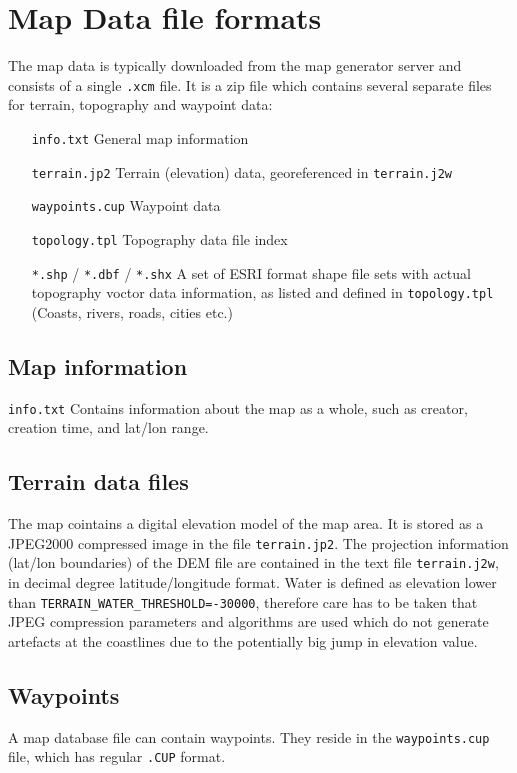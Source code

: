 \section{Map Data file formats}
The map data is typically downloaded from the map generator server and consists of a single \texttt{.xcm} file.
It is a zip file which contains several separate files for terrain, topography and waypoint data:
\begin{itemize}
\item[\texttt{info.txt}] General map information
\item[\texttt{terrain.jp2}] Terrain (elevation) data, georeferenced in \texttt{terrain.j2w}
\item[\texttt{waypoints.cup}] Waypoint data
\item[\texttt{topology.tpl}] Topography data file index
\item[\texttt{*.shp} / \texttt{*.dbf} / \texttt{*.shx}] A set of ESRI format shape file sets with actual topography voctor data information, as listed and defined in \texttt{topology.tpl} (Coasts, rivers, roads, cities etc.)
\end{itemize}
\subsection{Map information}
\texttt{info.txt}
Contains information about the map as a whole, such as creator, creation time, and lat/lon range.

\subsection{Terrain data files}
The map cointains a digital elevation model of the map area. It is stored as a JPEG2000 compressed image in the file \texttt{terrain.jp2}. The projection information (lat/lon boundaries) of the DEM file are contained in the text file \texttt{terrain.j2w}, in decimal degree latitude/longitude format.
Water is defined as elevation lower than \texttt{TERRAIN\_WATER\_THRESHOLD=-30000}, therefore care has to be taken that JPEG compression parameters and algorithms  are used which do not generate artefacts at the coastlines due to the potentially big jump in elevation value.
\subsection{Waypoints}
A map database file can contain waypoints. They reside in the \texttt{waypoints.cup} file, which has regular \texttt{.CUP} format.

